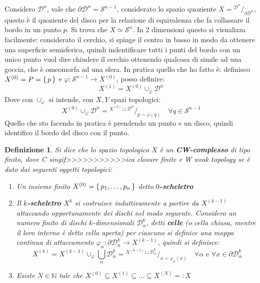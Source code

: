 \documentclass[10pt, twoside=false, x11names]{scrbook}
\newtheorem{definition}[theorem]{Definizione}
\newcommand{\Sph}[1][]{\mathcal{S}^#1}
\newcommand{\Disk}[1][]{\mathcal{D}^#1}
\newcommand*\quot[2]{{^{\textstyle #1}\big/_{\textstyle #2}}}
\let\phi\varphi
\begin{document}
Considero $ \Disk{n} $, vale che $ \partial\Disk{n} = \Sph{n-1} $, considerato lo spazio quoziente
$ X = \quot{\Disk{n}}{\partial \Disk{n}} $, questo è il quoziente del disco per la relazione
di equivalenza che fa collassare il bordo in un punto $ p $. Si trova che $ X \simeq \Sph{n} $.
In 2 dimensioni questo si visualizza facilmente: considerato il cerchio, si spinge il centro
in basso in modo da ottenere una superficie semisferica, quindi indentificare tutti i punti
del bordo con un unico punto vuol dire chiudere il cerchio ottenendo qualcosa di simile ad
una goccia, che è omeomorfa ad una sfera. In pratica quello che ho fatto è:
definisco $ X^{(0)} = P = \set{p} $ e $ \phi \colon \Sph{n-1} \to X^{(0)} $, posso definire:
\[
  X^{(1)} = X^{(0)} \cup_\phi \Disk{n}
\]
Dove con $ \cup_\phi $ si intende, con $ X, Y $ spazi topologici:
\[
  X^{(0)} \cup_\phi \Disk{n} = \quot{X^{(0)} \sqcup \Disk{n}}{p \sim \phi(q)} \quad \forall q \in \Sph{n-1}
\]
Quello che sto facendo in pratica è prendendo un punto e un disco, quindi
identifico il bordo del disco con il punto.


\begin{definition}
  Si dice che lo spazio topologico $ X $ è un \textbf{CW-complesso} di tipo finito,
  dove C singif>>>>>>>>>>>ica \emph{closure finite} e W \emph{weak topology} se è dato dai seguenti oggetti topologici:
  \begin{enumerate}
  \item Un insieme finito $ X^{(0)} = \set{p_1, \dots, p_n} $ detto \textbf{$ 0 $-scheletro}
  \item Il \textbf{$ k $-scheletro} $ X^{k} $ si costruisce induttivamente
    a partire da $ X^{(k-1)} $ attaccando opportunamente dei dischi nel modo seguente.
    Considero un numero finito di dischi $ k $-dimensionali $ \Disk{k}_\alpha $,
    detti \textbf{celle} (o cella chiusa, mentre
    il loro interno è detto cella aperta) per ciascuno si definice una mappa
    continua di attaccamento $ \phi_\alpha \colon \partial\Disk{k}_\alpha \to X^{(k-1)} $, quindi si definisce:
    \[
      X^{(k)} = X^{(k-1)} \cup_\phi \bigcup_\alpha \Disk{k}_\alpha = \quot{ X^{(k-1)} \sqcup \Disk{k}_\alpha}{x \sim \phi_\alpha(x)} \quad \forall \alpha \text{ e }
      \forall x \in \partial \Disk{k}_\alpha
    \]
  \item Esiste $ N \in \mathbb{N} $ tale che $ X^{(0)} \subseteq X^{(1)} \subseteq \dots \subseteq X^{(N)} =: X $
  \end{enumerate}
\end{definition}
\end{document}
